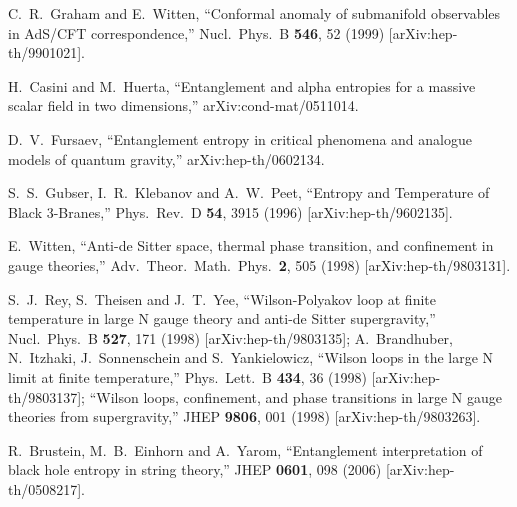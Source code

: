 \documentclass[amsmath,amssymb,nofootinbib,eqsecnum,tighten,prd,12pt]{revtex4}
\begin{document}
\begin{thebibliography}{99}

 C.~R.~Graham and E.~Witten,
  ``Conformal anomaly of submanifold observables in AdS/CFT correspondence,''
  Nucl.\ Phys.\ B {\bf 546}, 52 (1999)
  [arXiv:hep-th/9901021].


H.~Casini and M.~Huerta,
  ``Entanglement and alpha entropies for a massive scalar field in two
  dimensions,''
  arXiv:cond-mat/0511014.
  
D.~V.~Fursaev,
  ``Entanglement entropy in critical phenomena and analogue models of quantum
  gravity,'' arXiv:hep-th/0602134.

S.~S.~Gubser, I.~R.~Klebanov and A.~W.~Peet,
``Entropy and Temperature of Black 3-Branes,''
 Phys.\ Rev.\ D {\bf 54}, 3915 (1996)
 [arXiv:hep-th/9602135].

 E.~Witten,
  ``Anti-de Sitter space, thermal phase
  transition, and confinement in  gauge
  theories,''
  Adv.\ Theor.\ Math.\ Phys.\  {\bf 2}, 505 (1998)
  [arXiv:hep-th/9803131].



 S.~J.~Rey, S.~Theisen and J.~T.~Yee,
  ``Wilson-Polyakov loop at finite temperature in large N gauge theory and
  anti-de Sitter supergravity,''
  Nucl.\ Phys.\ B {\bf 527}, 171 (1998)
  [arXiv:hep-th/9803135];
A.~Brandhuber, N.~Itzhaki, J.~Sonnenschein and S.~Yankielowicz,
  ``Wilson loops in the large N limit at finite temperature,''
  Phys.\ Lett.\ B {\bf 434}, 36 (1998)
  [arXiv:hep-th/9803137];
   ``Wilson loops, confinement, and phase transitions in large N gauge  theories
  from supergravity,''
  JHEP {\bf 9806}, 001 (1998)
  [arXiv:hep-th/9803263].
  
  R.~Brustein, M.~B.~Einhorn and A.~Yarom,
  ``Entanglement interpretation of black hole entropy in string theory,''
  JHEP {\bf 0601}, 098 (2006)
  [arXiv:hep-th/0508217].
  


\end{thebibliography}




\end{document}
